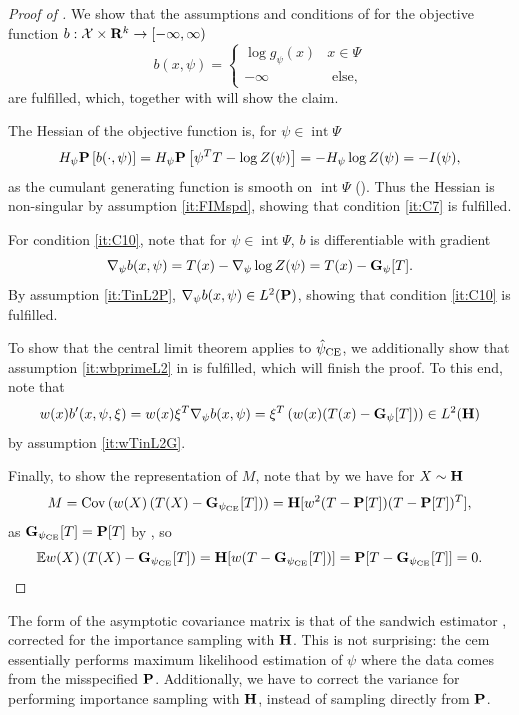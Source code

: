 \begin{proof}[Proof of ]
    We show that the assumptions and conditions of  for the objective function $b : \mathcal X \times \R^{k} \to [-\infty, \infty)$ 
    $$
        b(x,\psi) = \begin{cases}
            \log g_{\psi}(x) & x\in\Psi\\
            - \infty & \text{ else,}
        \end{cases}
    $$
    are fulfilled, which, together with  will show the claim. 

    The Hessian of the objective function is, for $\psi \in \operatorname{int} \Psi$
    $$
        H_{\psi} \P \left[ b(\cdot, \psi) \right] = H_{\psi} \P \left[ \psi^{T} T - \log Z(\psi) \right] = -H_{\psi}\log Z(\psi)  = - I(\psi),
    $$
    as the cumulant generating function is smooth on $ \operatorname{int} \Psi$ (). Thus the Hessian is non-singular by assumption \ref{it:FIMspd}, showing that condition \ref{it:C7} is fulfilled.

    For condition \ref{it:C10}, note that for $\psi \in \operatorname{int} \Psi$, $b$ is differentiable with gradient 
    $$
        \nabla_{\psi} b(x, \psi) = T(x) - \nabla_{\psi} \log Z(\psi) = T(x) - \G_{\psi} [T].
    $$
    By assumption \ref{it:TinL2P}, $\nabla_{\psi} b(x,\psi) \in L^{2} (\P)$, showing that condition \ref{it:C10} is fulfilled.

    To show that the central limit theorem applies to $\hpce$, we additionally show that assumption \ref{it:wbprimeL2} in  is fulfilled, which will finish the proof. To this end, note that 
    $$
        w(x)b'(x,\psi,\xi) = w(x) \xi^{T}\nabla_{\psi} b(x, \psi) = \xi^{T} \left( w(x) (T(x) - \G_{\psi}[T]) \right) \in L^{2} (\H)
    $$
    by assumption \ref{it:wTinL2G}.

    Finally, to show the representation of $M$, note that by  we have for $X \sim \H$
    $$
        M = \cov \left( w(X) \left( T(X) - \G_{\pce}[T]\right)\right) = \H [w^{2} (T - \P [T])(T - \P[T])^{T}],
    $$
    as $\G_{\pce} [T] = \P [T]$ by , so $$\E w(X) \left( T(X) - \G_{\pce} [T] \right) = \H[w (T - \G_{\pce}[T])] = \P[T - \G_{\pce}[T]] =  0.$$
\end{proof}

The form of the asymptotic covariance matrix is that of the sandwich estimator \citep{White1982Maximum}, corrected for the importance sampling with $\H$. This is not surprising: the \gls{cem} essentially performs maximum likelihood estimation of $\psi$ where the data comes from the misspecified $\P$. Additionally, we have to correct the variance for performing importance sampling with $\H$, instead of sampling directly from $\P$.

